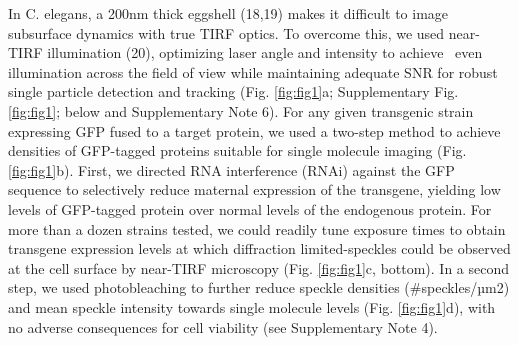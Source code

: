  In C. elegans, a 200nm thick eggshell (18,19) makes it difficult to image subsurface dynamics with true TIRF optics. To overcome this, we used near-TIRF illumination (20), optimizing laser angle and intensity to achieve ~even illumination across the field of view while maintaining adequate SNR for robust single particle detection and tracking (Fig. \ref{fig:fig1}a; Supplementary Fig. \ref{fig:fig1}; below and Supplementary Note 6). For any given transgenic strain expressing GFP fused to a target protein, we used a two-step method to achieve densities of GFP-tagged proteins suitable for single molecule imaging (Fig. \ref{fig:fig1}b). First, we directed RNA interference (RNAi) against the GFP sequence to selectively reduce maternal expression of the transgene, yielding low levels of GFP-tagged protein over normal levels of the endogenous protein. For more than a dozen strains tested, we could readily tune exposure times to obtain transgene expression levels at which diffraction limited-speckles could be observed at the cell surface by near-TIRF microscopy (Fig. \ref{fig:fig1}c, bottom). In a second step, we used photobleaching to further reduce speckle densities (\#speckles/µm2) and mean speckle intensity towards single molecule levels (Fig. \ref{fig:fig1}d), with no adverse consequences for cell viability (see Supplementary Note 4).
 
 
 

